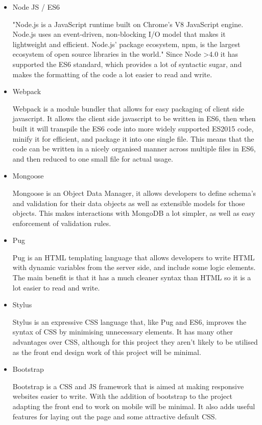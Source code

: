 \begin{itemize}
  \item Node JS / ES6

    "Node.js is a JavaScript runtime built on Chrome's V8 JavaScript engine. Node.js uses an event-driven, non-blocking I/O model that makes it lightweight and efficient. Node.js' package ecosystem, npm, is the largest ecosystem of open source libraries in the world."\cite{node-org}
    Since Node >4.0 it has supported the ES6 standard, which provides a lot of syntactic sugar, and makes the formatting of the code a lot easier to read and write. 
  \item Webpack
    
    Webpack is a module bundler that allows for easy packaging of client side javascript. It allows the client side javascript to be written in ES6, then when built it will transpile the ES6 code into more widely supported ES2015 code, minify it for efficient, and package it into one single file. This means that the code can be written in a nicely organised manner across multiple files in ES6, and then reduced to one small file for actual usage. 

  \item Mongoose

    Mongoose is an Object Data Manager, it allows developers to define schema's and validation for their data objects as well as extensible models for those objects. This makes interactions with MongoDB a lot simpler, as well as easy enforcement of validation rules.

  \item Pug

    Pug is an HTML templating language that allows developers to write HTML with dynamic variables from the server side, and include some logic elements. The main benefit is that it has a much cleaner syntax than HTML so it is a lot easier to read and write. 

  \item Stylus

    Stylus is an expressive CSS language that, like Pug and ES6, improves the syntax of CSS by minimising unnecessary elements. It has many other advantages over CSS, although for this project they aren't likely to be utilised as the front end design work of this project will be minimal. 

  \item Bootstrap

    Bootstrap is a CSS and JS framework that is aimed at making responsive websites easier to write. With the addition of bootstrap to the project adapting the front end to work on mobile will be minimal. It also adds useful features for laying out the page and some attractive default CSS. 
\end{itemize}


